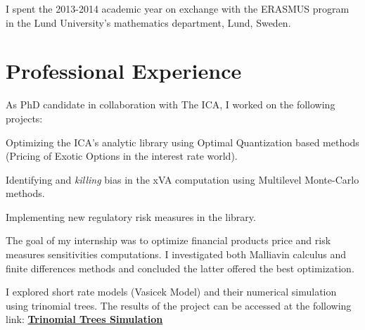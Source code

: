 \documentclass[]{deedy-resume-openfont}
\begin{document}
\begin{minipage}[t]{0.64\textwidth}
I spent the 2013-2014 academic year on exchange with the ERASMUS program in the Lund University's mathematics department, Lund, Sweden.



\vspace{\topsep}
\vspace{\topsep}
\section{Professional Experience}

As PhD candidate in collaboration with The ICA, I worked on the following projects:
\begin{tightemize}
\item Optimizing the ICA's analytic library using Optimal Quantization based methods (Pricing of Exotic Options in the interest rate world).
\item Identifying and \textit{killing} bias in the xVA computation using Multilevel Monte-Carlo methods.
\item Implementing new regulatory risk measures in the library.
\end{tightemize}

\sectionsep

The goal of my internship was to optimize financial products price and risk measures sensitivities computations. I investigated both Malliavin calculus and finite differences methods and concluded the latter offered the best optimization.
\sectionsep

I explored short rate models (Vasicek Model) and their numerical simulation using trinomial trees. The results of the project can be accessed at the following link: \href{http://simulations.lpsm.paris/trinomial_trees/}{\bf Trinomial Trees Simulation}
\sectionsep

\end{minipage} 
\end{document}
